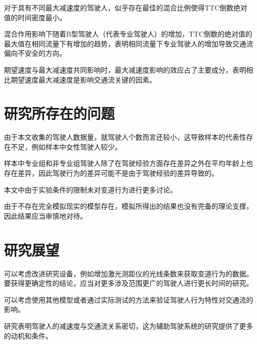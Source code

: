 对于具有不同最大减速度的驾驶人，似乎存在最佳的混合比例使得TTC倒数绝对值的时间密度最小。

混合作用影响下随着B型驾驶人（代表专业驾驶人）的增加，TTC倒数的绝对值的最大值在相同流量下有增加的趋势，表明相同流量下专业驾驶人的增加导致交通流偏向不安全的方向。

期望速度与最大减速度共同影响时，最大减速度影响的效应占了主要成分，表明相比期望速度最大减速度是影响交通流关键的因素。


\section{研究所存在的问题}

由于本文收集的驾驶人数据量，就驾驶人个数而言还较小，这导致样本的代表性存在不足，例如样本中女性驾驶人较少。

样本中专业组和非专业组驾驶人除了在驾驶经验方面存在差异之外在平均年龄上也存在差异，因此驾驶行为的差异可能不是由于驾驶经验的差异导致的。

本文中由于实验条件的限制未对变道行为进行更多讨论。

由于不存在完全模拟现实的模型存在，模拟所得出的结果也没有完备的理论支撑，因此结果应当审慎地对待。



\section{研究展望}

可以考虑改进研究设备，例如增加激光测距仪的光线条数来获取变道行为的数据。要获得更确定性的结论，应当对更多涉及范围更广的驾驶人进行更长时间的研究。

可以考虑使用其他模型或者通过实际测试的方法来验证驾驶人行为特性对交通流的影响。

研究表明驾驶人的减速度与交通流关系密切，这为辅助驾驶系统的研究提供了更多的动机和条件。


